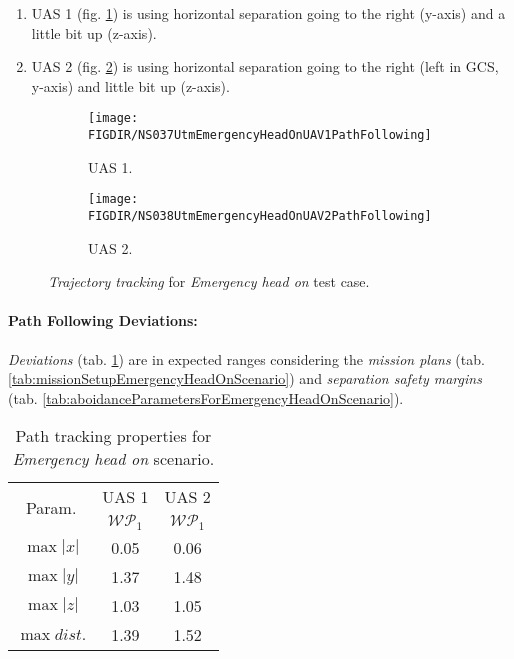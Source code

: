 \begin{enumerate}
    \item UAS 1 (fig. \ref{fig:emergencyHeadOnUAS1PathTracking}) is using horizontal separation going to the right (y-axis) and a little bit up (z-axis).
    
    \item UAS 2 (fig. \ref{fig:emergencyHeadOnUAS2PathTracking}) is using horizontal separation going to the right (left in GCS, y-axis) and little bit up (z-axis).
\end{enumerate}

\begin{figure}[H]
	\centering
    \begin{subfigure}{0.48\textwidth}
    	\centering
        \texttt{[image: \\FIGDIR/NS037UtmEmergencyHeadOnUAV1PathFollowing]}
        \caption{UAS 1.}
        \label{fig:emergencyHeadOnUAS1PathTracking}
    \end{subfigure}
    \begin{subfigure}{0.48\textwidth}
    	\centering
        \texttt{[image: \\FIGDIR/NS038UtmEmergencyHeadOnUAV2PathFollowing]} 
        \caption{UAS 2.}
        \label{fig:emergencyHeadOnUAS2PathTracking}
    \end{subfigure}
    \caption{\emph{Trajectory tracking} for \emph{Emergency head on} test case. }
    \label{fig:emergencyHeadOnTrajectoryTrackingPerformance}
\end{figure}


\paragraph{Path Following Deviations:} \emph{Deviations} (tab. \ref{tab:pathTrackingParametersForEmergencyHeadOn}) are in expected ranges considering the \emph{mission plans} (tab. \ref{tab:missionSetupEmergencyHeadOnScenario}) and \emph{separation safety margins} (tab. \ref{tab:aboidanceParametersForEmergencyHeadOnScenario}).


\begin{table}[H]
    \centering
    \begin{tabular}{c||c|c}
        \multirow{2}{*}{Param.} & UAS 1     & UAS 2\\\cline{2-3}
                        & $\mathscr{WP}_1$  & $\mathscr{WP}_1$\\\hline\hline
          $\max |x|$    & 0.05              & 0.06 \\\hline
          $\max |y|$    & 1.37              & 1.48 \\\hline
          $\max |z|$    & 1.03              & 1.05 \\\hline
          $\max dist.$  & 1.39              & 1.52 \\
    \end{tabular}
    \caption{Path tracking properties for \emph{Emergency head on} scenario.}
    \label{tab:pathTrackingParametersForEmergencyHeadOn}
\end{table}


